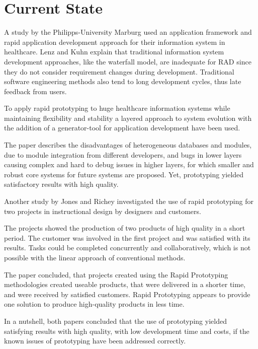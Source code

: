 \documentclass[runningheads]{llncs}
\begin{document}
\section{Current State}
A study by the Philipps-University Marburg \cite{ref_health} used an application framework and
rapid application development approach for their information system in healthcare.
Lenz and Kuhn\cite{ref_health} explain that traditional information system development approaches, like
the waterfall model, are inadequate for RAD since they do not consider requirement changes during development. 
Traditional software engineering methods also tend to long development cycles, thus late feedback from users.

To apply rapid prototyping to huge healthcare information systems while maintaining flexibility and stability
a layered approach to system evolution with the addition of a generator-tool for application development 
have been used. 

The paper describes the disadvantages of heterogeneous databases and modules, due to module integration
from different developers, and bugs in lower layers causing complex and hard to debug issues in higher layers, 
for which smaller and robust core systems for future systems are proposed. Yet, prototyping yielded 
satisfactory results with high quality.

Another study by Jones and Richey \cite{ref_RPInAction} investigated the use of rapid prototyping for 
two projects in instructional design by designers and customers. 

The projects showed the production of two products of high quality in a short period. The customer
was involved in the first project and was satisfied with its results. Tasks could be completed concurrently
and collaboratively, which is not possible with the linear approach of conventional methods.

The paper concluded, that projects created using the Rapid Prototyping methodologies created useable products, that were 
delivered in a shorter time, and were received by satisfied customers. Rapid Prototyping appears to provide one solution 
to produce high-quality products in less time.

In a nutshell, both papers concluded that the use of prototyping yielded satisfying results with high quality, with low
development time and costs, if the known issues of prototyping have been addressed correctly.
\end{document}
